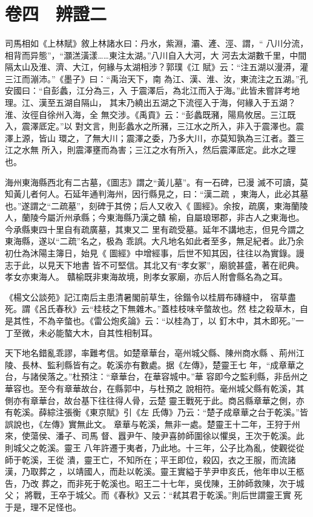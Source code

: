 \documentclass{ctexart}
\begin{document}
\section{卷四　辨證二}
\paragraph{}
司馬相如《上林賦》敘上林諸水曰：丹水，紫淵，灞、滻、涇、謂，`` 八川分流，相背而异態''，``灝溔潢漾……東注太湖。''八川自入大河，大 河去太湖數千里，中間隔太山及淮、濟、大江，何緣与太湖相涉？郭璞《江 賦》云：``注五湖以漫漭，灌三江而漰沛。''《墨子》曰：``禹治天下，南 為江、漢、淮、汝，東流注之五湖。''孔安國曰：``自彭蠡，江分為三，入 于震澤后，為北江而入于海。''此皆未嘗詳考地理。江、漢至五湖自隔山， 其末乃繞出五湖之下流徑入于海，何緣入于五湖？淮、汝徑自徐州入海，全 無交涉。《禹貢》云：``彭蠡既瀦，陽鳥攸居。三江既入，震澤厎定。''以 對文言，則彭蠡水之所瀦，三江水之所入，非入于震澤也。震澤上源，皆山 環之，了無大川；震澤之委，乃多大川，亦莫知孰為三江者。蓋三江之水無 所入，則震澤壅而為害；三江之水有所入，然后震澤厎定。此水之理也。

海州東海縣西北有二古墓，《圖志》謂之``黃儿墓''。有一石碑，已漫 滅不可讀，莫知黃儿者何人。石延年通判海州，因行縣見之，曰：``漢二疏 ，東海人，此必其墓也。''遂謂之``二疏墓''，刻碑于其傍；后人又收入《 圖經》。余按，疏廣，東海蘭陵人，蘭陵今屬沂州承縣；今東海縣乃漢之贛 榆，自屬琅琊郡，非古人之東海也。今承縣東四十里自有疏廣墓，其東又二 里有疏受墓。延年不講地志，但見今謂之東海縣，遂以``二疏''名之，极為 乖誤。大凡地名如此者至多，無足紀者。此乃余初仕為沐陽主簿日，始見《 圖經》中增經事，后世不知其因，往往以為實錄。謾志于此，以見天下地書 皆不可堅信。其北又有``孝女冢''，廟貌甚盛，著在祀典。孝女亦東海人。 贛榆既非東海故境，則孝女冢廟，亦后人附會縣名為之耳。

《楊文公談苑》記江南后主患清暑閣前草生，徐鍇令以桂屑布磚縫中， 宿草盡死。謂《呂氏春秋》云``桂枝之下無雜木。''蓋桂枝味辛螫故也。然 桂之殺草木，自是其性，不為辛螫也。《雷公炮炙論》云：``以桂為丁，以 釘木中，其木即死。''一丁至微，未必能螯大木，自其性相制耳。

天下地名錯亂乖謬，率難考信。如楚章華台，亳州城父縣、陳州商水縣 、荊州江陵、長林、監利縣皆有之。乾溪亦有數處。据《左傳》，楚靈王七 年，``成章華之台，与諸侯落之。''杜預注：``章華台，在華容城中。''華 容即今之監利縣，非岳州之華容也。至今有章華故台，在縣郭中，与杜預之 說相符。毫州城父縣有乾溪，其側亦有章華台，故台基下往往得人骨，云楚 靈王戰死于此。商呂縣章華之側，亦有乾溪。薛綜注張衡《東京賦》引《左 氏傳》乃云：``楚子成章華之台于乾溪。''皆誤說也，《左傳》實無此文。 章華与乾溪，無非一處。楚靈王十二年，王狩于州來，使蕩侯、潘子、司馬 督、囂尹午、陵尹喜帥師圍徐以懼吳，王次于乾溪。此則城父之乾溪。靈王 八年許遷于夷者，乃此地。十三年，公子比為亂，使觀從從師于乾溪，王從 潰，靈王亡，不知所在；平王即位，殺囚，衣之王服，而流諸漢，乃取葬之 ，以靖國人，而赴以乾溪。靈王實縊于芋尹申亥氏，他年申以王柩告，乃改 葬之，而非死于乾溪也。昭王二十七年，吳伐陳，王帥師救陳，次于城父； 將戰，王卒于城父。而《春秋》又云：``弒其君于乾溪。''則后世謂靈王實 死于是，理不足怪也。
\end{document}
